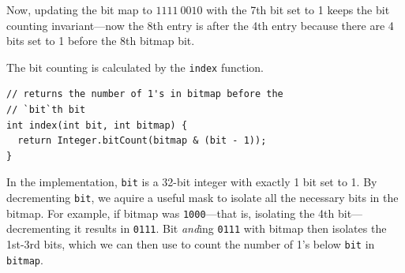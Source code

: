 \documentclass[preprint]{sigplanconf}
\begin{document}

Now, updating the bit map to $1111\ 0010$
with the 7th bit set to 1 keeps the bit counting
invariant---now the 8th entry is after the 4th
entry because there are 4 bits set to 1
before the 8th bitmap bit.

The bit counting is calculated by
the \texttt{index} function.

\begin{verbatim}
// returns the number of 1's in bitmap before the 
// `bit`th bit
int index(int bit, int bitmap) {
  return Integer.bitCount(bitmap & (bit - 1));
}
\end{verbatim}

In the implementation, \texttt{bit}
is a 32-bit integer with exactly 1 bit set to 1.
By decrementing \texttt{bit}, we aquire
a useful mask to isolate all the necessary
bits in the bitmap.
For example, if bitmap was \texttt{1000}---that
is, isolating the 4th bit---decrementing it results 
in \texttt{0111}.
Bit \textit{and}ing \texttt{0111}
with bitmap then isolates the 1st-3rd bits, which
we can then use to count the number of 1's
below \texttt{bit} in \texttt{bitmap}.
\end{document}
